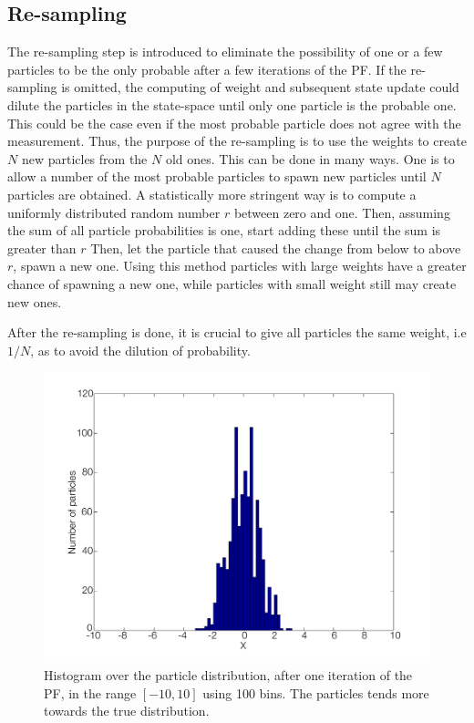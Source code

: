 \documentclass{LTHthesis}
\begin{document}
\subsection{Re-sampling}
%
The re-sampling step is introduced to eliminate the possibility of one or a few particles to be the only probable after a few iterations of the PF. If the re-sampling is omitted, the computing of weight and subsequent state update could dilute the particles in the state-space until only one particle is the probable one. This could be the case even if the most probable particle does not agree with the measurement. Thus, the purpose of the re-sampling is to use the weights to create $N$ new particles from the $N$ old ones. This can be done in many ways. One is to allow a number of the most probable particles to spawn new particles until $N$ particles are obtained. A statistically more stringent way is to compute a uniformly distributed random number $r$ between zero and one. Then, assuming the sum of all particle probabilities is one, start adding these until the sum is greater than $r$ Then, let the particle that caused the change from below to above $r$, spawn a new one. Using this method particles with large weights have a greater chance of spawning a new one, while particles with small weight still may create new ones.

After the re-sampling is done, it is crucial to give all particles the same weight, i.e $1/N$, as to avoid the dilution of probability.
%
\begin{figure}[!hbt]

\includegraphics[width=1\textwidth ]{images/PF/hist_dist_1_itr}
\caption{Histogram over the particle distribution, after one iteration of the PF, in the range $[-10,10]$ using 100 bins. The particles tends more towards the true distribution.}\label{hist_dist_1_itr}
\end{figure}
\end{document}
